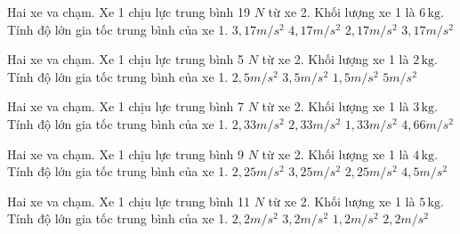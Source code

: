 \begin{ex}
Hai xe va chạm. Xe 1 chịu lực trung bình 19 $N$ từ xe 2. Khối lượng xe 1 là $6\,\text{kg}$. Tính độ lớn gia tốc trung bình của xe 1.
\choice
{$3,17 m/s^2$}
{$4,17 m/s^2$}
{$2,17 m/s^2$}
{\True $3,17 m/s^2$}
\end{ex}

\begin{ex}
Hai xe va chạm. Xe 1 chịu lực trung bình 5 $N$ từ xe 2. Khối lượng xe 1 là $2\,\text{kg}$. Tính độ lớn gia tốc trung bình của xe 1.
\choice
{\True $2,5 m/s^2$}
{$3,5 m/s^2$}
{$1,5 m/s^2$}
{$5 m/s^2$}
\end{ex}

\begin{ex}
Hai xe va chạm. Xe 1 chịu lực trung bình 7 $N$ từ xe 2. Khối lượng xe 1 là $3\,\text{kg}$. Tính độ lớn gia tốc trung bình của xe 1.
\choice
{$2,33 m/s^2$}
{\True $2,33 m/s^2$}
{$1,33 m/s^2$}
{$4,66 m/s^2$}
\end{ex}

\begin{ex}
Hai xe va chạm. Xe 1 chịu lực trung bình 9 $N$ từ xe 2. Khối lượng xe 1 là $4\,\text{kg}$. Tính độ lớn gia tốc trung bình của xe 1.
\choice
{$2,25 m/s^2$}
{$3,25 m/s^2$}
{\True $2,25 m/s^2$}
{$4,5 m/s^2$}
\end{ex}

\begin{ex}
Hai xe va chạm. Xe 1 chịu lực trung bình 11 $N$ từ xe 2. Khối lượng xe 1 là $5\,\text{kg}$. Tính độ lớn gia tốc trung bình của xe 1.
\choice
{$2,2 m/s^2$}
{$3,2 m/s^2$}
{$1,2 m/s^2$}
{\True $2,2 m/s^2$}
\end{ex}

